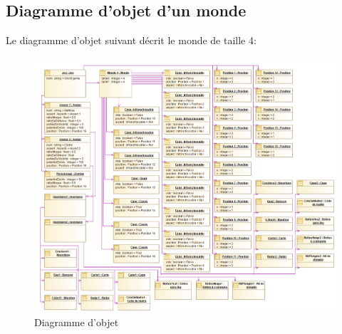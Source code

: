 
\subsection{Diagramme d'objet d'un monde}
\label{sec:question-6}

Le diagramme d'objet suivant décrit le monde de taille 4:

\begin{figure}[h!]
	\centering
	\includegraphics[width=350pt]{assets/Diagramme_objet}
	\caption{Diagramme d'objet}
	\label{fig:diagrammeobjet}
\end{figure}